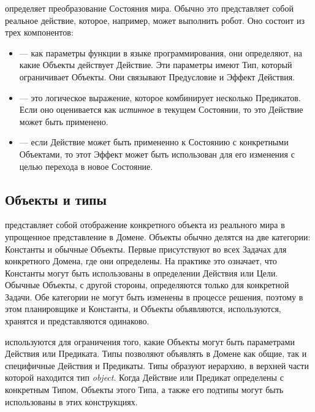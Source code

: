 
 определяет преобразование Состояния мира.
Обычно это представляет собой реальное действие,
которое, например, может выполнить робот.
Оно состоит из трех компонентов:
\begin{itemize}
  \item {} --- как параметры функции в языке программирования,
    они определяют, на какие Объекты действует Действие.
    Эти параметры имеют Тип, который ограничивает Объекты.
    Они связывают Предусловие и Эффект Действия.
  \item {} --- это логическое выражение, которое комбинирует
    несколько Предикатов. Если оно оценивается как \textit{истинное} в текущем Состоянии,
    то это Действие может быть применено.
  \item {} --- если Действие может быть примененно к Состоянию
    с конкретными Объектами, то этот Эффект может быть
    использован для его изменения с целью перехода в новое Состояние.
\end{itemize}

\subsection{Объекты и типы}

 представляет собой отображение конкретного объекта
из реального мира в упрощенное представление в Домене.
Объекты обычно делятся на две категории: Константы и обычные Объекты.
Первые присутствуют во всех Задачах для конкретного Домена,
где они определены. На практике это означает, что Константы
могут быть использованы в определении Действия или Цели.
Обычные Объекты, с другой стороны, определяются только для конкретной Задачи.
Обе категории не могут быть изменены в процессе решения, поэтому в этом планировщике
и Константы, и Объекты
объявляются, используются, хранятся и представляются одинаково.

 используются для ограничения того,
какие Объекты могут быть параметрами Действия или Предиката.
Типы позволяют объявлять в Домене как общие, так и специфичные Действия и Предикаты.
Типы образуют иерархию, в верхней части которой находится тип \textit{object}.
Когда Действие или Предикат определены с конкретным Типом,
Объекты этого Типа, а также его подтипы могут быть использованы в этих конструкциях.

